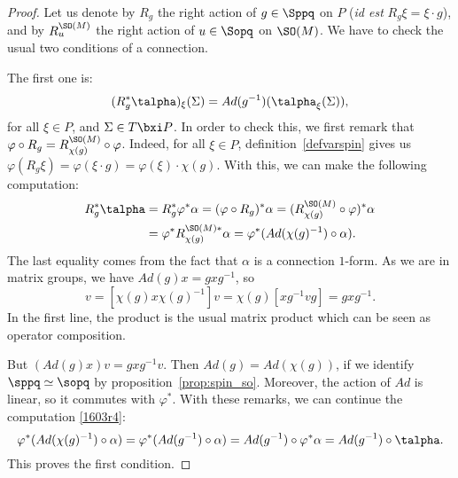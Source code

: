 \begin{proof}
	Let us denote by $R_g$ the right action of $g\in\Sppq$ on $P$ (\emph{id est} $R_g\xi=\xi\cdot g$), and by $R_u^{\SO(M)}$ the right action of $u\in\Sopq$ on $\SO(M)$.
	We  have to check the usual two conditions of a connection.

	The first one is:
	\[
		(R_g^*\talpha)_{\xi}(\Sigma)=Ad(g^{-1})(\talpha_{\xi}(\Sigma)),
	\]
	for all $\xi\in P$, and $\Sigma\in T\bxi P$. In order to check this, we first remark that $\varphi\circ R_g=R_{\chi(g)}^{\SO(M)}\circ\varphi$. Indeed, for all $\xi\in P$, definition~\ref{defvarspin} gives us $\varphi(R_g\xi)=\varphi(\xi\cdot g)=\varphi(\xi)\cdot\chi(g)$.  With this, we can make the following computation:
	\begin{equation}\label{1603r4}
		\begin{aligned}
			R_g^*\talpha & =R_g^*\varphi^*\alpha=(\varphi\circ   R_g)^*\alpha	=(R_{\chi(g)}^{\SO(M)}\circ\varphi)^*\alpha \\
			             & =\varphi^*R_{\chi(g)}^{\SO(M)*}\alpha=\varphi^*(Ad(\chi(g)^{-1})\circ\alpha).
		\end{aligned}
	\end{equation}
	The last equality comes from the fact that $\alpha$ is a connection $1$-form. As we are in matrix groups, we have $Ad(g)x=gxg^{-1}$, so
	\begin{equation}
		[Ad(\chi(g))x]v=[\chi(g) x \chi(g)^{-1}]v
		=\chi(g)[xg^{-1} vg]
		=gxg^{-1}.
	\end{equation}
	In the first line, the product is the usual matrix product which can be seen as operator composition.

	But $(Ad(g)x)v=gxg^{-1} v$. Then $Ad(g)=Ad(\chi(g))$, if we identify $\sppq\simeq\sopq$ by proposition~\ref{prop:spin_so}. Moreover, the action of $Ad$ is linear, so it commutes with $\varphi^*$. With these remarks, we can continue the computation \eqref{1603r4}:
	\begin{equation}
		\varphi^*(Ad(\chi(g)^{-1})\circ\alpha)=\varphi^*(Ad(g^{-1})\circ\alpha)
		=Ad(g^{-1})\circ\varphi^*\alpha
		=Ad(g^{-1})\circ\talpha.
	\end{equation}
	This proves the first condition.


\end{proof}

